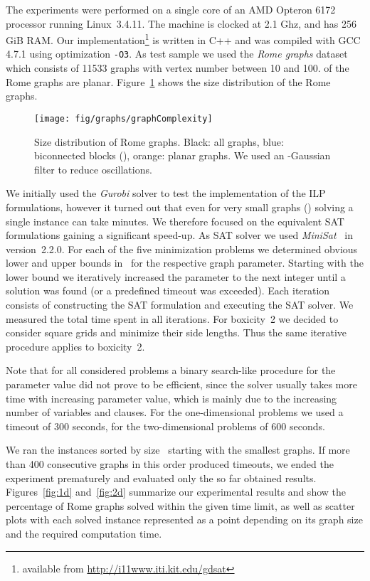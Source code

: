 \documentclass[runningheads]{llncs}
\newcounter{constr}
\begin{document}
The experiments were performed on a single core of an
AMD Opteron 6172 processor running Linux~3.4.11. The machine is
clocked at 2.1 Ghz, and has 256 GiB RAM. Our
implementation\footnote{available from
\url{http://i11www.iti.kit.edu/gdsat}} is written
in C++ and was compiled with GCC 4.7.1 using optimization
\texttt{-O3}. As test sample we used the \emph{Rome graphs} dataset
\cite{rome} which consists of 11533 graphs with vertex number between
10 and 100.  of the Rome graphs are planar.
Figure~\ref{fig:size-distr} shows
the size distribution of the Rome graphs.

\begin{figure}[tbp]
\centering
  \texttt{[image: fig/graphs/graphComplexity]}
 \caption{\small Size distribution of Rome graphs.
 Black: all graphs,
 blue: biconnected blocks (),
 orange: planar graphs. We used an -Gaussian filter to
reduce oscillations.  
 }
 \label{fig:size-distr}
\end{figure}


We initially used the \emph{Gurobi} solver \cite{gurobi} to
test the implementation of the ILP formulations, however it turned out
that even for very small graphs () solving a single instance can
take minutes. We therefore focused on the equivalent SAT
formulations gaining a significant speed-up. As SAT solver we used
\emph{MiniSat}~\cite{minisat} in version~2.2.0.  
For each of the five minimization problems we determined obvious lower and upper bounds in~ for the respective graph parameter. Starting with the lower bound we iteratively increased the parameter to the next integer until a solution was found (or a predefined timeout was exceeded). Each iteration consists of constructing the SAT formulation 
and executing the SAT solver. We measured the total time spent in all iterations.
For boxicity~2 we decided to consider square grids and minimize
their side lengths. Thus the same iterative procedure applies to boxicity~2.



Note that for all considered
problems a binary search-like procedure for the parameter value did not prove to be efficient, since the solver usually takes more time with increasing parameter value, which is mainly due to the increasing number of variables and
clauses.
For the one-dimensional problems we used a timeout of 300 seconds, for the two-dimensional problems of 600 seconds. 

We ran the instances sorted by size~ starting with the smallest
graphs. If more than 400 consecutive graphs in this order produced
timeouts, we ended the experiment prematurely and evaluated only the
so far obtained results. Figures~\ref{fig:1d} and~\ref{fig:2d}
summarize our experimental results and show the percentage of Rome
graphs solved within the given time limit, as well as scatter plots
with each solved instance represented as a point depending on its
graph size and the required computation time. 
\end{document}
